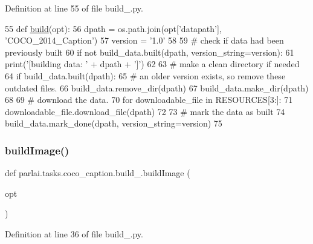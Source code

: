 Definition at line 55 of file build\+\_.\+py.


\begin{DoxyCode}
55 \textcolor{keyword}{def }\hyperlink{namespaceparlai_1_1tasks_1_1coco__caption_1_1build__2014_a4e0353d80ebb2d951fca7555c18548b4}{build}(opt):
56     dpath = os.path.join(opt[\textcolor{stringliteral}{'datapath'}], \textcolor{stringliteral}{'COCO\_2014\_Caption'})
57     version = \textcolor{stringliteral}{'1.0'}
58 
59     \textcolor{comment}{# check if data had been previously built}
60     \textcolor{keywordflow}{if} \textcolor{keywordflow}{not} build\_data.built(dpath, version\_string=version):
61         print(\textcolor{stringliteral}{'[building data: '} + dpath + \textcolor{stringliteral}{']'})
62 
63         \textcolor{comment}{# make a clean directory if needed}
64         \textcolor{keywordflow}{if} build\_data.built(dpath):
65             \textcolor{comment}{# an older version exists, so remove these outdated files.}
66             build\_data.remove\_dir(dpath)
67         build\_data.make\_dir(dpath)
68 
69         \textcolor{comment}{# download the data.}
70         \textcolor{keywordflow}{for} downloadable\_file \textcolor{keywordflow}{in} RESOURCES[3:]:
71             downloadable\_file.download\_file(dpath)
72 
73         \textcolor{comment}{# mark the data as built}
74         build\_data.mark\_done(dpath, version\_string=version)
75 \end{DoxyCode}
\mbox{\label{namespaceparlai_1_1tasks_1_1coco__caption_1_1build__2014_acd8cdd7a90cf4d7d348184dd2ca1545b}} 
\subsubsection{\texorpdfstring{build\+Image()}{buildImage()}}
{\footnotesize\ttfamily def parlai.\+tasks.\+coco\+\_\+caption.\+build\+\_.\+build\+Image (\begin{DoxyParamCaption}\item[{}]{opt }\end{DoxyParamCaption})}



Definition at line 36 of file build\+\_.\+py.


